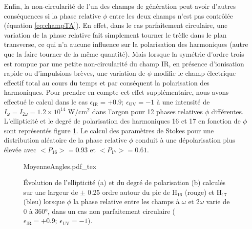 Enfin, la non-circularité de l'un des champs de génération peut avoir d'autres conséquences si la phase relative $\phi$ entre les deux champs n'est pas contrôlée (équation \ref{eq:champTA}). En effet, dans le cas parfaitement circulaire, une variation de la phase relative fait simplement tourner le trèfle dans le plan transverse, ce qui n'a aucune influence sur la polarisation des harmoniques (autre que la faire tourner de la même quantité). Mais lorsque la symétrie d'ordre trois est rompue par une petite non-circularité du champ IR, en présence d'ionisation rapide ou d'impulsions brèves, une variation de $\phi$ modifie le champ électrique effectif total au cours du temps et par conséquent la polarisation des harmoniques. Pour prendre en compte cet effet supplémentaire, nous avons effectué le calcul dans le cas $\epsilon_{\text{IR}} = +0.9 ; \: \epsilon_{\text{UV}} = -1$ à une intensité de $I_\omega = I_{2\omega} = 1.2 \times 10^{14}$ W/cm$^2$ dans l'argon pour 12 phases relatives $\phi$ différentes. L'ellipticité et le degré de polarisation des harmoniques 16 et 17 en fonction de $\phi$ sont représentés figure \ref{fig:MoyenneAngles}. Le calcul des paramètres de Stokes pour une distribution aléatoire de la phase relative $\phi$ conduit à une dépolarisation plus élevée avec $<P_{16}> = 0.93$ et $<P_{17}> = 0.61$.

\begin{figure}
\centering
\def\svgwidth{\textwidth}
{MoyenneAngles.pdf_tex}
\caption{\'{E}volution de l'ellipticité (a) et du degré de polarisation (b) calculés sur une largeur de $\pm$ 0.25 ordre autour du pic de H$_{16}$ (rouge) et H$_{17}$ (bleu) lorsque $\phi$ la phase relative entre les champs à $\omega$ et 2$\omega$ varie de 0 à 360°, dans un cas non parfaitement circulaire ($\epsilon_{\text{IR}} = +0.9 ; \: \epsilon_{\text{UV}} = -1$).}
\label{fig:MoyenneAngles}
\end{figure}

